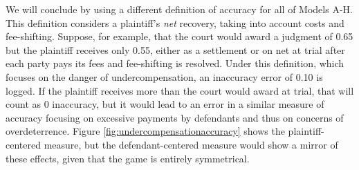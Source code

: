 \documentclass{article}
\begin{document}
We will conclude by using a different definition of accuracy for all of Models A-H. This definition considers a plaintiff's \textit{net} recovery, taking into account costs and fee-shifting. Suppose, for example, that the court would award a judgment of 0.65 but the plaintiff receives only 0.55, either as a settlement or on net at trial after each party pays its fees and fee-shifting is resolved. Under this definition, which focuses on the danger of undercompensation, an inaccuracy error of 0.10 is logged. If the plaintiff receives more than the court would award at trial, that will count as 0 inaccuracy, but it would lead to an error in a similar measure of accuracy focusing on excessive payments by defendants and thus on concerns of overdeterrence. Figure \ref{fig:undercompensationaccuracy} shows the plaintiff-centered measure, but the defendant-centered measure would show a mirror of these effects, given that the game is entirely symmetrical. 
\end{document}
